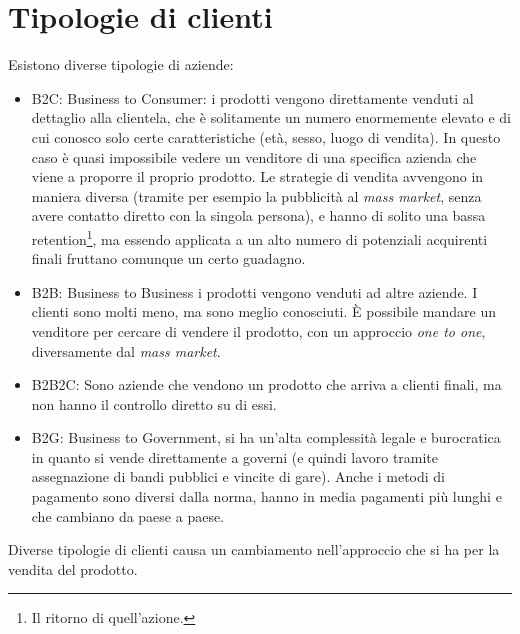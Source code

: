 \section{Tipologie di clienti}

Esistono diverse tipologie di aziende:
\begin{itemize}
 \item B2C: Business to Consumer: i prodotti vengono direttamente venduti al
dettaglio alla clientela, che è solitamente un numero enormemente elevato e di
cui conosco solo certe caratteristiche (età, sesso, luogo di vendita). In
questo caso è quasi impossibile vedere un venditore di una specifica azienda che
viene a proporre il proprio prodotto. Le strategie di vendita avvengono in
maniera diversa (tramite per esempio la pubblicità al \textit{mass market},
senza avere contatto diretto con la singola persona), e hanno di solito una
bassa retention\footnote{Il ritorno di quell'azione.}, ma essendo applicata a
un alto numero di potenziali acquirenti finali fruttano comunque un certo
guadagno.
 \item B2B: Business to Business i prodotti vengono venduti ad altre aziende. I
clienti sono molti meno, ma sono meglio conosciuti. È possibile mandare un
venditore per cercare di vendere il prodotto, con un approccio \textit{one to
one}, diversamente dal \textit{mass market}.
 \item B2B2C: Sono aziende che vendono un prodotto che arriva a clienti finali,
ma non hanno il controllo diretto su di essi.
 \item B2G: Business to Government, si ha un'alta complessità legale e
burocratica in quanto si vende direttamente a governi (e quindi lavoro tramite
assegnazione di bandi pubblici e vincite di gare). Anche i metodi di pagamento
sono diversi dalla norma, hanno in media pagamenti più lunghi e che cambiano da
paese a paese.
\end{itemize}

Diverse tipologie di clienti causa un cambiamento nell'approccio che si ha per
la vendita del prodotto.
